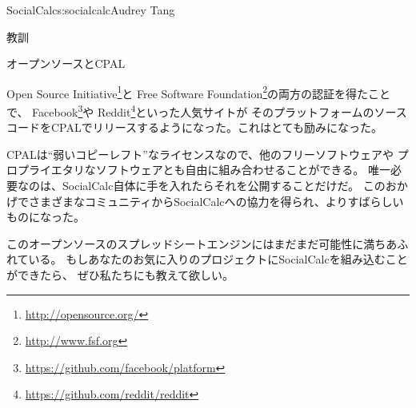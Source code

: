 \begin{aosachapter}{SocialCalc}{s:socialcalc}{Audrey Tang}
\begin{aosasect1}{教訓}
\begin{aosasect2}{オープンソースとCPAL}

Open Source Initiative\footnote{\url{http://opensource.org/}}と
Free Software Foundation\footnote{\url{http://www.fsf.org}}の両方の認証を得たことで、
Facebook\footnote{\url{https://github.com/facebook/platform}}や
Reddit\footnote{\url{https://github.com/reddit/reddit}}といった人気サイトが
そのプラットフォームのソースコードをCPALでリリースするようになった。これはとても励みになった。


CPALは``弱いコピーレフト''なライセンスなので、他のフリーソフトウェアや
プロプライエタリなソフトウェアとも自由に組み合わせることができる。
唯一必要なのは、SocialCalc自体に手を入れたらそれを公開することだけだ。
このおかげでさまざまなコミュニティからSocialCalcへの協力を得られ、よりすばらしいものになった。


このオープンソースのスプレッドシートエンジンにはまだまだ可能性に満ちあふれている。
もしあなたのお気に入りのプロジェクトにSocialCalcを組み込むことができたら、
ぜひ私たちにも教えて欲しい。

\end{aosasect2}

\end{aosasect1}

\end{aosachapter}
